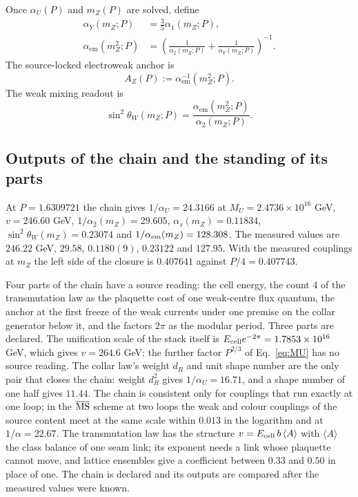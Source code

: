 \documentclass[11pt]{article}
\theoremstyle{remark}
\newcommand{\AZ}{A_Z}
\begin{document}
Once \(\alpha_U(P)\) and \(m_Z(P)\) are solved, define
\begin{align}
\alpha_Y(m_Z;P)&=\frac{3}{5}\alpha_1(m_Z;P),\\
\alpha_{\mathrm{em}}(m_Z^2;P)
&=
\left(
\frac{1}{\alpha_2(m_Z;P)}
+\frac{1}{\alpha_Y(m_Z;P)}
\right)^{-1}.
\label{eq:alphaem}
\end{align}
The source-locked electroweak anchor is
\begin{equation}
\boxed{
\AZ(P):=\alpha_{\mathrm{em}}^{-1}(m_Z^2;P).
}
\label{eq:AZ}
\end{equation}
The weak mixing readout is
\begin{equation}
\sin^2\theta_W(m_Z;P)=
\frac{\alpha_{\mathrm{em}}(m_Z^2;P)}{\alpha_2(m_Z;P)}.
\label{eq:sin2}
\end{equation}


\subsection{Outputs of the chain and the standing of its parts}
\label{sec:chain-standing}

At \(P=1.6309721\) the chain gives \(1/\alpha_U=24.3166\) at
\(M_U=2.4736\times10^{16}\) GeV, \(v=246.60\) GeV, \(1/\alpha_2(m_Z)=29.605\),
\(\alpha_s(m_Z)=0.11834\), \(\sin^2\theta_W(m_Z)=0.23074\) and
\(1/\alpha_{\rm em}(m_Z)=128.308\). The measured values are \(246.22\) GeV, \(29.58\),
\(0.1180(9)\), \(0.23122\) and \(127.95\). With the measured couplings at \(m_Z\) the left side of the closure is
\(0.407641\) against \(P/4=0.407743\).

Four parts of the chain have a source reading: the cell energy, the count \(4\) of the
transmutation law as the plaquette cost of one weak-centre flux quantum, the anchor at the
first freeze of the weak currents under one premise on the collar generator below it, and
the factors \(2\pi\) as the modular period. Three parts are declared. The unification scale
of the stack itself is \(E_{\rm cell}e^{-2\pi}=1.7853\times10^{16}\) GeV, which gives
\(v=264.6\) GeV; the further factor \(P^{2/3}\) of Eq.~\eqref{eq:MU} has no source reading.
The collar law's weight \(d_R\) and unit shape number are the only pair that closes the
chain: weight \(d_R^2\) gives \(1/\alpha_U=16.71\), and a shape number of one half gives
\(11.44\). The chain is consistent only for couplings that run exactly at one loop; in the
\(\overline{\rm MS}\) scheme at two loops the weak and colour couplings of the source
content meet at the same scale within \(0.013\) in the logarithm and at \(1/\alpha=22.67\).
The transmutation law has the structure \(v=E_{\rm cell}\,b\,\langle A\rangle\) with
\(\langle A\rangle\) the class balance of one seam link; its exponent needs a link whose
plaquette cannot move, and lattice ensembles give a coefficient between \(0.33\) and \(0.50\)
in place of one. The chain is declared and its outputs are compared after the measured values
were known.
\end{document}
